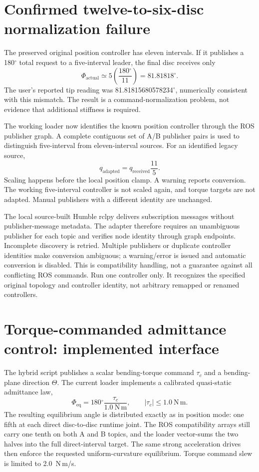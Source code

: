 \documentclass[11pt,letterpaper]{article}
\newcommand{\degrees}{\ensuremath{^{\circ}}}
\begin{document}
\section{Confirmed twelve-to-six-disc normalization failure}
The preserved original position controller has eleven intervals. If it
publishes a 180\degrees{} total request to a five-interval leader, the final
disc receives only
\begin{equation}
\Phi_{\mathrm{actual}}\simeq5\left(\frac{180\degrees}{11}\right)
  =81.81818\degrees.
\end{equation}
The user's reported tip reading was 81.81815680578234\degrees{}, numerically
consistent with this mismatch. The result is a command-normalization problem,
not evidence that additional stiffness is required.

The working loader now identifies the known position controller through the
ROS publisher graph. A complete contiguous set of A/B publisher pairs is used
to distinguish five-interval from eleven-interval sources. For an identified
legacy source,
\begin{equation}
q_{\mathrm{adapted}}=q_{\mathrm{received}}\frac{11}{5}.
\end{equation}
Scaling happens before the local position clamp. A warning reports conversion.
The working five-interval controller is not scaled again, and torque targets
are not adapted. Manual publishers with a different identity are unchanged.

The local source-built Humble rclpy delivers subscription messages without
publisher-message metadata. The adapter therefore requires an unambiguous
publisher for each topic and verifies node identity through graph endpoints.
Incomplete discovery is retried. Multiple publishers or duplicate controller
identities make conversion ambiguous; a warning/error is issued and automatic
conversion is disabled. This is compatibility handling, not a guarantee against
all conflicting ROS commands. Run one controller only. It recognizes the
specified original topology and controller identity, not arbitrary remapped
or renamed controllers.

\section{Torque-commanded admittance control: implemented interface}
The hybrid script publishes a scalar bending-torque command $\tau_c$ and a
bending-plane direction $\Theta$. The current loader implements a calibrated
quasi-static admittance law,
\begin{equation}
\Phi_{\mathrm{eq}}=180\degrees\frac{\tau_c}{1.0~\mathrm{N\,m}},
\qquad |\tau_c|\leq1.0~\mathrm{N\,m}.
\end{equation}
The resulting equilibrium angle is distributed exactly as in position mode:
one fifth at each direct disc-to-disc runtime joint. The ROS compatibility
arrays still carry one tenth on both A and B topics, and the loader vector-sums
the two halves into the full direct-interval target. The same strong
acceleration drives then enforce the requested uniform-curvature equilibrium.
Torque command slew is limited to 2.0~N\,m/s.
\end{document}
